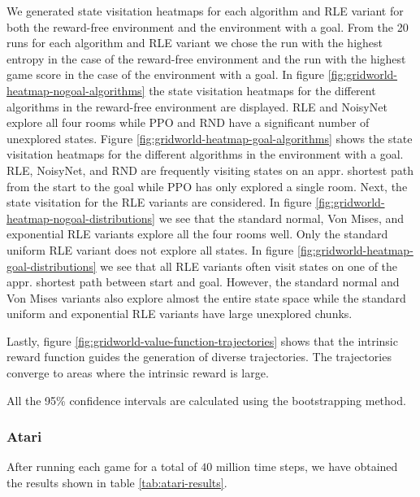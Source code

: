 \documentclass[10pt]{article} %
\begin{document}
We generated state visitation heatmaps for each algorithm and RLE variant for both the reward-free environment and the environment with a goal. From the 20 runs for each algorithm and RLE variant we chose the run with the highest entropy in the case of the reward-free environment and the run with the highest game score in the case of the environment with a goal. In figure \ref{fig:gridworld-heatmap-nogoal-algorithms} the state visitation heatmaps for the different algorithms in the reward-free environment are displayed. RLE and NoisyNet explore all four rooms while PPO and RND have a significant number of unexplored states. Figure \ref{fig:gridworld-heatmap-goal-algorithms} shows the state visitation heatmaps for the different algorithms in the environment with a goal. RLE, NoisyNet, and RND are frequently visiting states on an appr. shortest path from the start to the goal while PPO has only explored a single room. Next, the state visitation for the RLE variants are considered. In figure \ref{fig:gridworld-heatmap-nogoal-distributions} we see that the standard normal, Von Mises, and exponential RLE variants explore all the four rooms well. Only the standard uniform RLE variant does not explore all states. In figure \ref{fig:gridworld-heatmap-goal-distributions} we see that all RLE variants often visit states on one of the appr. shortest path between start and goal. However, the standard normal and Von Mises variants also explore almost the entire state space while the standard uniform and exponential RLE variants have large unexplored chunks.

Lastly, figure \ref{fig:gridworld-value-function-trajectories} shows that the intrinsic reward function guides the generation of diverse trajectories. The trajectories converge to areas where the intrinsic reward is large. 

All the 95\% confidence intervals are calculated using the bootstrapping method. 

\subsubsection{Atari}

After running each game for a total of $40$ million time steps, we have obtained the results shown in table \ref{tab:atari-results}.
\end{document}
